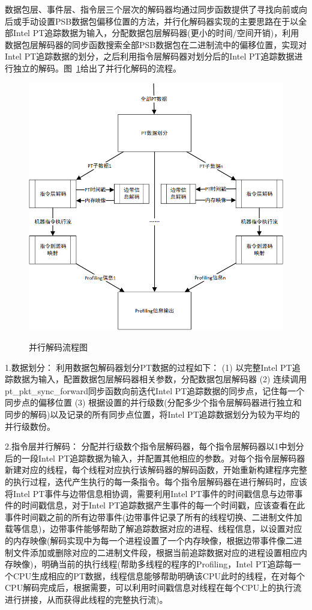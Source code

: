 数据包层、事件层、指令层三个层次的解码器均通过同步函数提供了寻找向前或向后或手动设置PSB数据包偏移位置的方法，并行化解码器实现的主要思路在于以全部Intel PT追踪数据为输入，分配数据包层解码器(更小的时间/空间开销)，利用数据包层解码器的同步函数搜索全部PSB数据包在二进制流中的偏移位置，实现对Intel PT追踪数据的划分，之后利用指令层解码器对划分后的Intel PT追踪数据进行独立的解码。图~\ref{fig:decode-process}给出了并行化解码的流程。
\begin{figure}[!htb]
  \centering
  \includegraphics[width=1.0\textwidth]
  {figures/decode-process.png}\\
  \caption{并行解码流程图}
  \label{fig:decode-process}
\end{figure}

1.数据划分：
利用数据包解码器划分PT数据的过程如下：
(1) 以完整Intel PT追踪数据为输入，配置数据包层解码器相关参数，分配数据包层解码器 (2) 连续调用pt\_pkt\_sync\_forward同步函数向前迭代Intel PT追踪数据的同步点，记住每一个同步点的偏移位置 (3) 根据设置的并行级数(分配多少个指令层解码器进行独立和同步的解码)以及记录的所有同步点位置，将Intel PT追踪数据划分为较为平均的并行级数份。

2.指令层并行解码：
分配并行级数个指令层解码器，每个指令层解码器以1中划分后的一段Intel PT追踪数据为输入，并配置其他相应的参数。对每个指令层解码器新建对应的线程，每个线程对应执行该解码器的解码函数，开始重新构建程序完整的执行过程，迭代产生执行的每一条指令。每个指令层解码器在进行解码时，应该将Intel PT事件与边带信息相协调，需要利用Intel PT事件的时间戳信息与边带事件的时间戳信息，对于Intel PT追踪数据产生事件的每一个时间戳，应该查看在此事件时间戳之前的所有边带事件(边带事件记录了所有的线程切换、二进制文件加载等信息)，边带事件能够帮助了解追踪数据对应的进程、线程信息，以设置对应的内存映像(解码实现中为每一个进程设置了一个内存映像，根据边带事件像二进制文件添加或删除对应的二进制文件段，根据当前追踪数据对应的进程设置相应内存映像)，明确当前的执行线程(帮助多线程的程序的Profiling，Intel PT追踪每一个CPU生成相应的PT数据，线程信息能够帮助明确该CPU此时的线程，在对每个CPU解码完成后，根据需要，可以利用时间戳信息对线程在每个CPU上的执行流进行拼接，从而获得此线程的完整执行流)。

